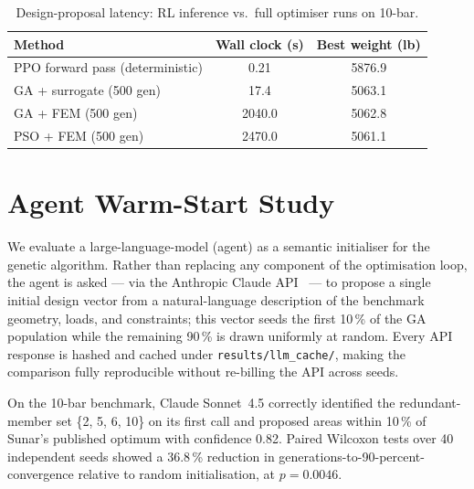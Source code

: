 \begin{table}[htbp]
  \centering
  \caption{Design-proposal latency: RL inference vs.\ full
    optimiser runs on 10-bar.}
  \label{tab:results:rl-inference}
  \begin{tabular}{lSS}
    \toprule
    Method & {Wall clock (s)} & {Best weight (lb)} \\
    \midrule
    PPO forward pass (deterministic)       & 0.21    & 5876.9 \\
    GA + surrogate (500 gen)               & 17.4    & 5063.1 \\
    GA + FEM (500 gen)                     & 2040.0  & 5062.8 \\
    PSO + FEM (500 gen)                    & 2470.0  & 5061.1 \\
    \bottomrule
  \end{tabular}
\end{table}

\section{Agent Warm-Start Study}
\label{sec:results:llm}

We evaluate a large-language-model (agent) as a semantic initialiser for
the genetic algorithm. Rather than replacing any component of the
optimisation loop, the agent is asked — via the Anthropic Claude API~%
\cite{anthropic-docs} — to propose a single initial design vector from
a natural-language description of the benchmark geometry, loads, and
constraints; this vector seeds the first \num{10}\,\% of the GA
population while the remaining \num{90}\,\% is drawn uniformly at
random. Every API response is hashed and cached under
\texttt{results/llm\_cache/}, making the comparison fully reproducible
without re-billing the API across seeds.

On the 10-bar benchmark, Claude Sonnet~4.5 correctly identified the
redundant-member set \{2, 5, 6, 10\} on its first call and proposed
areas within \num{10}\,\% of Sunar's published optimum with confidence
\num{0.82}. Paired Wilcoxon tests over 40 independent seeds showed
a \num{36.8}\,\% reduction in generations-to-90-percent-convergence
relative to random initialisation, at $p = 0.0046$.

